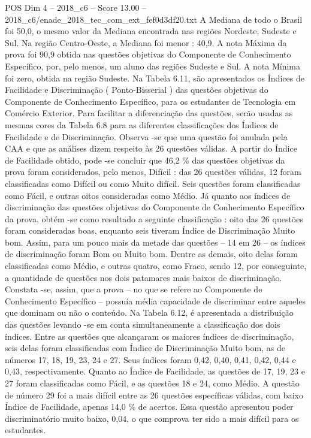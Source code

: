 \begin{textsample}{POS Dim 4 – 2018\_c6 – Score 13.00 – 2018\_c6/enade\_2018\_tec\_com\_ext\_fef0d3df20.txt}
A Mediana de todo o Brasil foi 50,0, o mesmo valor da Mediana encontrada nas regiões Nordeste, Sudeste e Sul.
Na região Centro-Oeste, a Mediana foi menor : 40,9.
A nota Máxima da prova foi 90,9 obtida nas questões objetivas do Componente de Conhecimento Específico, por, pelo menos, um aluno das regiões Sudeste e Sul.
A nota Mínima foi zero, obtida na região Sudeste.
Na Tabela 6.11, são apresentados os Índices de Facilidade e Discriminação ( Ponto-Bisserial ) das questões objetivas do Componente de Conhecimento Específico, para os estudantes de Tecnologia em Comércio Exterior.
Para facilitar a diferenciação das questões, serão usadas as mesmas cores da Tabela 6.8 para as diferentes classificações dos Índices de Facilidade e de Discriminação.
Observa -se que uma questão foi anulada pela CAA e que as análises dizem respeito às 26 questões válidas.
A partir do Índice de Facilidade obtido, pode -se concluir que 46,2 \% das questões objetivas da prova foram considerados, pelo menos, Difícil : das 26 questões válidas, 12 foram classificadas como Difícil ou como Muito difícil.
Seis questões foram classificadas como Fácil, e outras oitos consideradas como Médio.
Já quanto aos índices de discriminação das questões objetivas do Componente de Conhecimento Específico da prova, obtém -se como resultado a seguinte classificação : oito das 26 questões foram consideradas boas, enquanto seis tiveram Índice de Discriminação Muito bom.
Assim, para um pouco mais da metade das questões – 14 em 26 – os índices de discriminação foram Bom ou Muito bom.
Dentre as demais, oito delas foram classificadas como Médio, e outras quatro, como Fraco, sendo 12, por conseguinte, a quantidade de questões nos dois patamares mais baixos de discriminação.
Constata -se, assim, que a prova – no que se refere ao Componente de Conhecimento Específico – possuía média capacidade de discriminar entre aqueles que dominam ou não o conteúdo.
Na Tabela 6.12, é apresentada a distribuição das questões levando -se em conta simultaneamente a classificação dos dois índices.
Entre as questões que alcançaram os maiores índices de discriminação, seis delas foram classificadas com Índice de Discriminação Muito bom, as de números 17, 18, 19, 23, 24 e 27.
Seus índices foram 0,42, 0,40, 0,41, 0,42, 0,44 e 0,43, respectivamente.
Quanto ao Índice de Facilidade, as questões de 17, 19, 23 e 27 foram classificadas como Fácil, e as questões 18 e 24, como Médio.
A questão de número 29 foi a mais difícil entre as 26 questões específicas válidas, com baixo Índice de Facilidade, apenas 14,0 \% de acertos.
Essa questão apresentou poder discriminatório muito baixo, 0,04, o que comprova ter sido a mais difícil para os estudantes.

\end{textsample}
